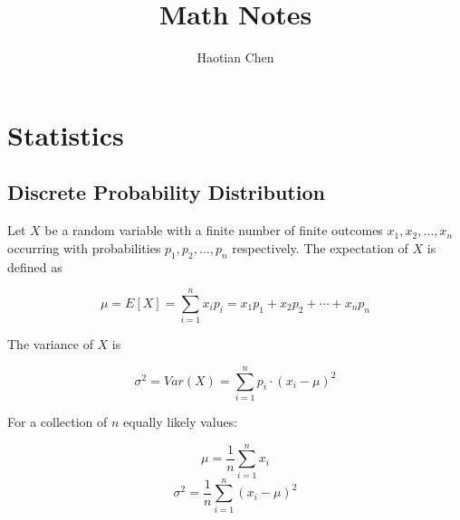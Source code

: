 \documentclass{article}
\title{Math Notes}
\author{Haotian Chen}
\date{}
\begin{document}
\maketitle

\clearpage

\tableofcontents{}

\clearpage

\section{Statistics}

\subsection{Discrete Probability Distribution}

Let \(X\) be a random variable with a finite number of finite outcomes \( x_{1},  x_{2}, \ldots, x_{n}\) occurring with probabilities \(p_{1}, p_{2}, \ldots, p_{n}\) respectively. The expectation of \(X\) is defined as

\[\mu = E[X] = \sum_{i=1}^{n}x_{i} p_{i} = x_{1} p_{1} + x_{2} p_{2} + \cdots  + x_{n} p_{n}\]

\noindent The variance of \(X\) is

\[\sigma^{2} = Var(X) = \sum_{i=1}^{n}p_{i} \cdot (x_{i} - \mu)^{2}\]

\noindent For a collection of \(n\) equally likely values:

\[\mu = \frac {1}{n} \sum_{i=1}^{n} x_{i}\]
\[\sigma^{2} = \frac {1}{n} \sum_{i=1}^{n} (x_{i} - \mu)^{2}\]

\printindex
\end{document}
